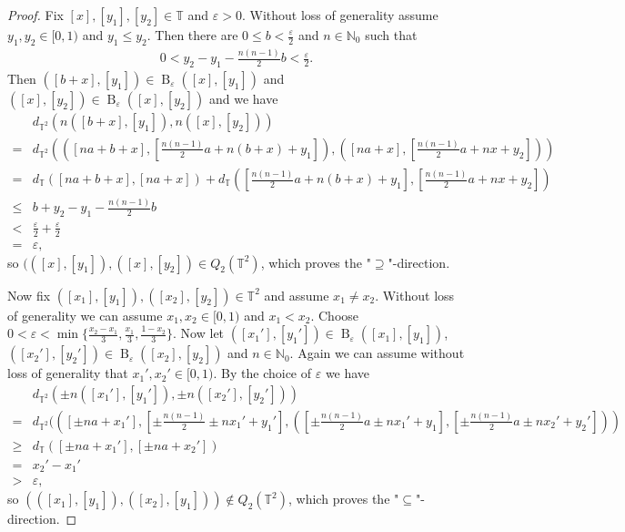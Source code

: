 \begin{proof}
	Fix $[x], [y_1], [y_2] \in \mathbb{T}$ and $\varepsilon > 0$. Without loss of generality assume $y_1, y_2 \in [0, 1)$ and $y_1 \leq y_2$. Then there are $0 \leq b < \frac{\varepsilon}{2}$ and $n \in \mathbb{N}_0$ such that
	\begin{align*}
		0 < y_2 - y_1 - \frac{n(n-1)}{2}b < \frac{\varepsilon}{2}.
	\end{align*}
	Then $([b+x], [y_1]) \in \operatorname{B}_\varepsilon([x], [y_1])$ and $([x],[y_2]) \in \operatorname{B}_\varepsilon([x], [y_2])$ and we have
	\begin{align*}
		&d_{\mathbb{T}^2}(n([b+x], [y_1]), n([x], [y_2]))\\
		= &d_{\mathbb{T}^2}(([na+b+x], [\frac{n(n-1)}{2}a + n(b+x) + y_1]), ([na+x], [\frac{n(n-1)}{2}a + nx + y_2]))\\
		= &d_\mathbb{T}([na+b+x], [na+x]) + d_\mathbb{T}([\frac{n(n-1)}{2}a + n(b+x) + y_1], [\frac{n(n-1)}{2}a + nx + y_2])\\
		\leq &b + y_2 - y_1 - \frac{n(n-1)}{2}b\\
		< &\frac{\varepsilon}{2} + \frac{\varepsilon}{2}\\
		= &\varepsilon,
	\end{align*}
	so $(([x], [y_1]), ([x], [y_2]) \in Q_2(\mathbb{T}^2)$, which proves the "$\supseteq$"-direction.
	
	Now fix $([x_1], [y_1]), ([x_2], [y_2]) \in \mathbb{T}^2$ and assume $x_1 \neq x_2$. Without loss of generality we can assume $x_1, x_2 \in [0, 1)$ and $x_1 < x_2$. Choose $0 < \varepsilon < \min\{\frac{x_2-x_1}{3}, \frac{x_1}{3}, \frac{1 - x_2}{3}\}$. Now let $([x_1'], [y_1']) \in \operatorname{B}_\varepsilon([x_1], [y_1])$, $([x_2'], [y_2']) \in \operatorname{B}_\varepsilon([x_2], [y_2])$ and $n \in \mathbb{N}_0$. Again we can assume without loss of generality that $x_1', x_2' \in [0, 1)$. By the choice of $\varepsilon$ we have
	\begin{align*}
		&d_{\mathbb{T}^2}(\pm n([x_1'], [y_1']), \pm n([x_2'], [y_2']))\\
		= &d_{\mathbb{T}^2}(([\pm na + x_1'], [\pm \frac{n(n-1)}{2} \pm nx_1' + y_1'], ([\pm \frac{n(n-1)}{2}a \pm nx_1' + y_1], [\pm \frac{n(n-1)}{2}a \pm nx_2' + y_2']))\\
		\geq &d_\mathbb{T}([\pm na + x_1'], [\pm na + x_2'])\\
		= &x_2' - x_1'\\
		> &\varepsilon,
	\end{align*}
	so $(([x_1], [y_1]), ([x_2], [y_1])) \notin Q_2(\mathbb{T}^2)$, which proves the "$\subseteq$"-direction.
\end{proof}
